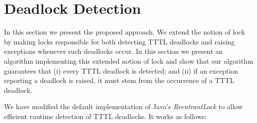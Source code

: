 \section{Deadlock Detection}

In this section we present the proposed approach. We extend the notion of lock by making locks responsible for both detecting TTTL deadlocks and raising exceptions whenever such deadlocks occur. In this section we present an algorithm implementing this extended notion of lock and show that our algorithm guarantees that (i) every TTTL deadlock is detected; and (ii) if an exception reporting a deadlock is raised, it must stem from the occurrence of a TTTL deadlock.

We have modified the default implementation of Java's \emph{ReentrantLock} to allow efficient runtime detection of TTTL deadlocks. It works as follows:


